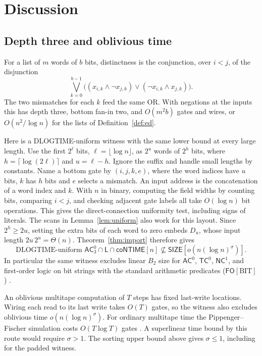 \documentclass[11pt]{article}
\theoremstyle{definition}
\theoremstyle{remark}
\newcommand{\SIZE}{\mathsf{SIZE}}
\newcommand{\coNTIME}{\mathsf{coNTIME}}
\newcommand{\Lclass}{\mathsf{L}}
\begin{document}
\section{Discussion}
\subsection{Depth three and oblivious time}\label{sec:depth-three}
For a list of $m$ words of $b$ bits, distinctness is the conjunction,
over $i<j$, of the disjunction
\[
 \bigvee_{k=0}^{b-1}
 \bigl((x_{i,k}\land\neg x_{j,k})\lor
       (\neg x_{i,k}\land x_{j,k})\bigr).
\]
The two mismatches for each $k$ feed the same OR. With negations at
the inputs this has depth three, bottom fan-in two, and $O(m^2b)$
gates and wires, or $O(n^2/\log n)$ for the lists of Definition~\ref{def:ed}.

Here is a DLOGTIME-uniform witness with the same lower bound at every
large length. Use the first $2^\ell$ bits, $\ell=\lfloor\log n\rfloor$,
as $2^u$ words of $2^h$ bits, where $h=\lceil\log(2\ell)\rceil$ and
$u=\ell-h$. Ignore the suffix and handle small lengths by constants.
Name a bottom gate by $(i,j,k,e)$, where the word indices have $u$ bits,
$k$ has $h$ bits and $e$ selects a mismatch. An input address is the
concatenation of a word index and $k$. With $n$ in binary, computing the
field widths by counting bits, comparing $i<j$, and checking adjacent
gate labels all take $O(\log n)$ bit operations. This gives the
direct-connection uniformity test, including signs of literals.
The scans in Lemma~\ref{lem:uniform} also work for this layout.
Since $2^h\ge 2u$, setting the extra bits of each word to zero embeds
$D_u$, whose input length $2u\,2^u=\Theta(n)$. Theorem~\ref{thm:import}
therefore gives
\[
 \text{DLOGTIME-uniform }\mathsf{AC}^0_3\cap\Lclass\cap\coNTIME[n]
 \not\subseteq \SIZE[o(n(\log n)^\sigma)].
\]
In particular the same witness excludes linear $B_2$ size for
$\mathsf{AC}^0$, $\mathsf{TC}^0$, $\mathsf{NC}^1$, and first-order
logic on bit strings with the standard arithmetic predicates
($\mathsf{FO}[\mathrm{BIT}]$) \cite{BIS}.

An oblivious multitape computation of $T$ steps has fixed last-write
locations. Wiring each read to its last write takes $O(T)$ gates, so
the witness also excludes oblivious time $o(n(\log n)^\sigma)$.
For ordinary multitape time the Pippenger--Fischer simulation costs
$O(T\log T)$ gates \cite{PF}. A superlinear time bound by this route
would require $\sigma>1$. The sorting upper bound above gives
$\sigma\le1$, including for the padded witness.
\end{document}
